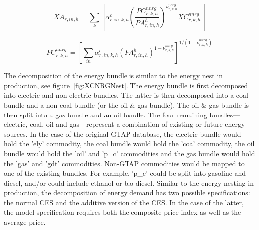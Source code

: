 \documentclass[11pt,letterpaper]{report}
\begin{document}
\begin{equation}
\label{eq:xacnnrg}
\mathit{XA}_{r,\mathit{in},h} =
   \sum_k{
      \left[
         \alpha^{\mathit{c}}_{r,\mathit{in},k,h}
         \left( \frac {\mathit{PC}^{\mathit{nnrg}}_{r,k,h}}
            {\mathit{PA}^{h}_{r,\mathit{in},h}}
         \right)^{\nu^{\mathit{nnrg}}_{r,k,h}}
         \mathit{XC}^{\mathit{nnrg}}_{r,k,h}
      \right]
   }
\end{equation}

\begin{equation}
\label{eq:pcnnrg}
\mathit{PC}^{\mathit{nnrg}}_{r,k,h} =
   \left[
      \sum_{\mathit{in}}{
         \alpha^{\mathit{c}}_{r,\mathit{in},k,h}
         \left( {\mathit{PA}^{h}_{r,\mathit{in},h}}
         \right)^{1-\nu^{\mathit{nnrg}}_{r,k,h}}
      }
   \right]^{1/(1-\nu^{\mathit{nnrg}}_{r,k,h})}
\end{equation}

The decomposition of the energy bundle is similar to the energy nest in
production, see figure~\ref{fig:XCNRGNest}. The energy bundle is first
decomposed into electric and non-electric bundles. The latter is then decomposed
into a coal bundle and a non-coal bundle (or the oil \& gas bundle).
The oil \& gas bundle is then split into a gas bundle and an oil bundle. The
four remaining bundles---electric, coal, oil and gas---represent a combination
of existing or future energy sources. In the case of the original GTAP database,
the electric bundle would hold the 'ely' commodity, the coal bundle would hold
the 'coa' commodity, the oil bundle would hold the 'oil' and 'p\_c' commodities
and the gas bundle would hold the 'gas' and 'gdt' commodities. Non-GTAP
commodities would be mapped to one of the existing bundles. For example, 'p\_c'
could be split into gasoline and diesel, and/or could include ethanol or
bio-diesel. Similar to the energy nesting in production, the decomposition
of energy demand has two possible specifications: the normal CES and the
additive version of the CES. In the case of the latter, the model specification
requires both the composite price index as well as the average price.
\end{document}
